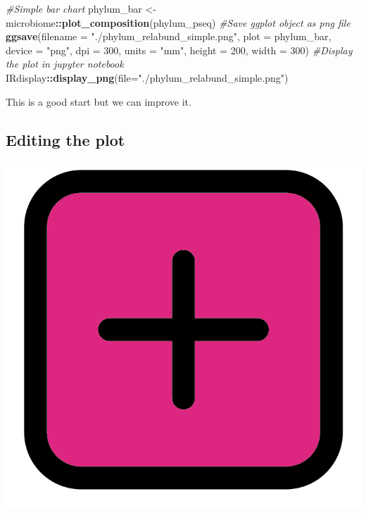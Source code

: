 \documentclass[
]{book}
\newenvironment{Shaded}{\begin{snugshade}}{\end{snugshade}}
\newcommand{\AttributeTok}[1]{\textcolor[rgb]{0.13,0.29,0.53}{#1}}
\newcommand{\CommentTok}[1]{\textcolor[rgb]{0.56,0.35,0.01}{\textit{#1}}}
\newcommand{\DecValTok}[1]{\textcolor[rgb]{0.00,0.00,0.81}{#1}}
\newcommand{\FunctionTok}[1]{\textcolor[rgb]{0.13,0.29,0.53}{\textbf{#1}}}
\newcommand{\NormalTok}[1]{#1}
\newcommand{\OtherTok}[1]{\textcolor[rgb]{0.56,0.35,0.01}{#1}}
\newcommand{\SpecialCharTok}[1]{\textcolor[rgb]{0.81,0.36,0.00}{\textbf{#1}}}
\newcommand{\StringTok}[1]{\textcolor[rgb]{0.31,0.60,0.02}{#1}}
\begin{document}
\begin{Shaded}
\begin{Highlighting}[]
\CommentTok{\#Simple bar chart}
\NormalTok{phylum\_bar }\OtherTok{\textless{}{-}}\NormalTok{ microbiome}\SpecialCharTok{::}\FunctionTok{plot\_composition}\NormalTok{(phylum\_pseq)}
\CommentTok{\#Save ggplot object as png file}
\FunctionTok{ggsave}\NormalTok{(}\AttributeTok{filename =} \StringTok{"./phylum\_relabund\_simple.png"}\NormalTok{, }\AttributeTok{plot =}\NormalTok{ phylum\_bar,}
       \AttributeTok{device =} \StringTok{"png"}\NormalTok{, }\AttributeTok{dpi =} \DecValTok{300}\NormalTok{, }\AttributeTok{units =} \StringTok{"mm"}\NormalTok{, }\AttributeTok{height =} \DecValTok{200}\NormalTok{, }\AttributeTok{width =} \DecValTok{300}\NormalTok{)}
\CommentTok{\#Display the plot in jupyter notebook}
\NormalTok{IRdisplay}\SpecialCharTok{::}\FunctionTok{display\_png}\NormalTok{(}\AttributeTok{file=}\StringTok{"./phylum\_relabund\_simple.png"}\NormalTok{)}
\end{Highlighting}
\end{Shaded}

This is a good start but we can improve it.

\hypertarget{editing-the-plot}{%
\subsection{Editing the plot}\label{editing-the-plot}}

\includegraphics{figures/plus_sign.png}
\end{document}
